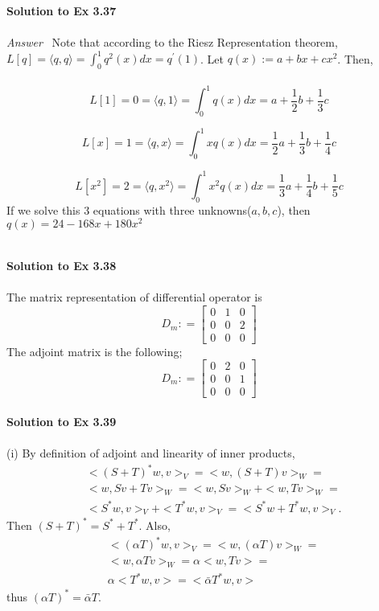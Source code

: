 \documentclass[letterpaper,12pt]{article}
\theoremstyle{definition}
\begin{document}
\begin{spacing}{1.3}{}
	
	\setlength{\leftskip}{10pt}
	
	\textbf{Solution to Ex 3.37} \\\\
	\emph{Answer} \ Note that according to the Riesz Representation theorem, $L[q] = \langle q,q \rangle = \int_{0}^{1} q^{2}(x)dx = q^{'}(1)$. Let $q(x) := a + bx + c x^2$. Then, \\\\
	\[L[1] = 0 =\langle q,1 \rangle = \int_{0}^{1} q(x)dx = a + \frac{1}{2}b + \frac{1}{3}c \]
	
	\[L[x] = 1 =\langle q,x \rangle = \int_{0}^{1} xq(x)dx = \frac{1}{2}a + \frac{1}{3}b + \frac{1}{4}c \]
	
	\[L[x^2] = 2 =\langle q,x^2 \rangle = \int_{0}^{1} x^2 q(x)dx = \frac{1}{3} a + \frac{1}{4}b + \frac{1}{5}c \]
	If we solve this 3 equations with three unknowns($a,b,c$), then
	$q(x) = 24 - 168x + 180 x^2$ \\\\
	
	\setlength{\leftskip}{10pt}
	
	\textbf{Solution to Ex 3.38} \\\\
	The matrix representation of differential operator is \\
	\[D_m : = \begin{bmatrix}
	0 & 1 & 0 \\
	0 & 0 & 2 \\
	0 & 0 & 0
	\end{bmatrix}\]
	The adjoint matrix is the following;
	\[D_m : = \begin{bmatrix}
	0 & 2 & 0 \\
	0 & 0 & 1 \\
	0 & 0 & 0
	\end{bmatrix}\]
	\setlength{\leftskip}{10pt}
	\\
	\textbf{Solution to Ex 3.39} \\\\
	(i)
	By definition of adjoint and linearity of inner products,
	\begin{align*}
	&<(S+T)^*w,v>_V  =
	<w,(S+T)v>_W  =\\
	&<w,Sv+Tv>_W  =
	<w,Sv>_W+<w,Tv>_W  =\\
	&<S^*w,v>_V + <T^*w,v>_V  =
	<S^*w+T^*w,v>_V.
	\end{align*}
	Then $(S+T)^*= S^*+T^*$.
	Also,
	\begin{align*}
	&<(\alpha T)^*w,v>_V  =
	<w,(\alpha T)v>_W  =\\
	&<w,\alpha Tv>_W  =
	\alpha<w, Tv>  =\\
	&\alpha<T^*w,v>  =
	<\bar{\alpha}T^*w,v>
	\end{align*}
	thus $(\alpha T)^*= \bar{\alpha}T$. \\\\
	

\end{spacing}
\end{document}
